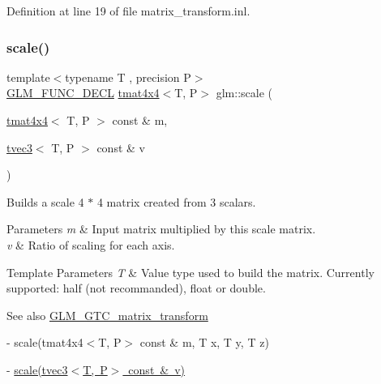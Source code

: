 Definition at line 19 of file matrix\+\_\+transform.\+inl.

\mbox{\label{group__gtc__matrix__transform_ga8f062fcc07e2445500793f2803afebb0}} 
\subsubsection{\texorpdfstring{scale()}{scale()}}
{\footnotesize\ttfamily template$<$typename T , precision P$>$ \\
\mbox{\hyperlink{setup_8hpp_ab2d052de21a70539923e9bcbf6e83a51}{G\+L\+M\+\_\+\+F\+U\+N\+C\+\_\+\+D\+E\+CL}} \mbox{\hyperlink{structglm_1_1tmat4x4}{tmat4x4}}$<$T, P$>$ glm\+::scale (\begin{DoxyParamCaption}\item[{\mbox{\hyperlink{structglm_1_1tmat4x4}{tmat4x4}}$<$ T, P $>$ const \&}]{m,  }\item[{\mbox{\hyperlink{structglm_1_1tvec3}{tvec3}}$<$ T, P $>$ const \&}]{v }\end{DoxyParamCaption})}

Builds a scale 4 $\ast$ 4 matrix created from 3 scalars.


\begin{DoxyParams}{Parameters}
{\em m} & Input matrix multiplied by this scale matrix. \\
\hline
{\em v} & Ratio of scaling for each axis. \\
\hline
\end{DoxyParams}

\begin{DoxyTemplParams}{Template Parameters}
{\em T} & Value type used to build the matrix. Currently supported\+: half (not recommanded), float or double. \\
\hline
\end{DoxyTemplParams}
\begin{DoxySeeAlso}{See also}
\mbox{\hyperlink{group__gtc__matrix__transform}{G\+L\+M\+\_\+\+G\+T\+C\+\_\+matrix\+\_\+transform}} 

-\/ scale(tmat4x4$<$\+T, P$>$ const \& m, T x, T y, T z) 

-\/ \mbox{\hyperlink{group__gtx__transform_ga1972d4a66a2e92637c8aaee598417a71}{scale(tvec3$<$\+T, P$>$ const \& v)}} 
\end{DoxySeeAlso}



